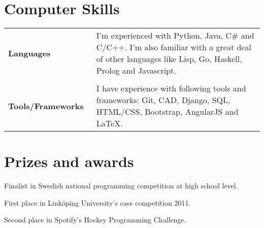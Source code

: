 \documentclass[a4paper,10pt]{article} %
\begin{document}
\section{Computer Skills}
\begin{tabular}{lp{13cm}}
\textbf{Languages} & \small{I'm experienced with Python, Java, C\# and C/C++. I'm also familiar with a great deal of other languages like Lisp, Go, Haskell, Prolog and Javascript.}\\\\
\textbf{Tools/Frameworks~} & \small{I have experience with following tools and frameworks: Git, CAD, Django, SQL, HTML/CSS, Bootstrap, AngularJS and LaTeX.}


\end{tabular}




\section{Prizes and awards}
\begin{itemize}[noitemsep,topsep=0pt,parsep=0pt,partopsep=0pt]
\small{
\item Finalist in Swedish national programming competition at high school level.
\item First place in Linköping University’s case competition 2011.
\item Second place in Spotify’s Hockey Programming Challenge.
}
\end{itemize}
\end{document}
